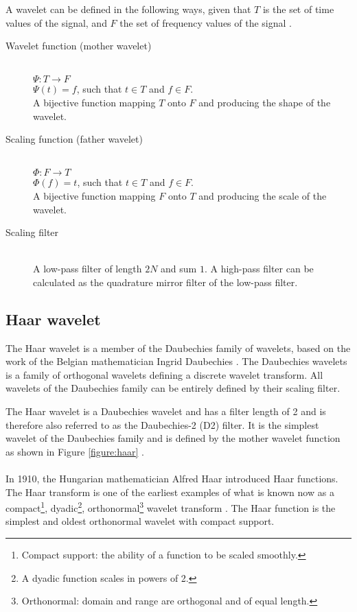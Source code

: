 A wavelet can be defined in the following ways, given that $T$ is the set of
time values of the signal, and $F$ the set of frequency values of the signal 
\cite{graps}.
\begin{description}
	\item[Wavelet function (mother wavelet)] \hfill \\ $\Psi: T \rightarrow
	F$\\ $\Psi(t) = f$, such that $t \in T$ and $f \in F$.\\
	A bijective function mapping $T$ onto $F$ and producing the shape of the
	wavelet.

	\item[Scaling function (father wavelet)] \hfill \\ $\Phi: F \rightarrow
	T$\\ $\Phi(f) = t$, such that $t \in T$ and $f \in F$.\\
	A bijective function mapping $F$ onto $T$ and producing the scale of the
	wavelet.

	\item[Scaling filter] \hfill \\ A low-pass filter of length $2N$ and sum $1$.
	A high-pass filter can be calculated as the quadrature mirror filter of the
	low-pass filter.
\end{description}

\subsection{Haar wavelet}
The Haar wavelet is a member of the Daubechies family of wavelets, based on the
work of the Belgian mathematician Ingrid Daubechies \cite{graps}. The
Daubechies wavelets is a family of orthogonal wavelets defining a discrete
wavelet transform. All wavelets of the Daubechies family can be entirely
defined by their scaling filter.

The Haar wavelet is a Daubechies wavelet and has a filter length of 2 and
is therefore also referred to as the Daubechies-2 (D2) filter. It is the
simplest wavelet of the Daubechies family and is defined by the mother wavelet
function as shown in Figure \ref{figure:haar} \cite{stankovic}.



\paragraph{}
In 1910, the Hungarian mathematician Alfred Haar introduced Haar functions. The
Haar transform is one of the earliest examples of what is known now as a
compact\footnote{Compact support: the ability of a function to be scaled
smoothly.}, dyadic\footnote{A dyadic function scales in powers of 2.},
orthonormal\footnote{Orthonormal: domain and range are orthogonal and of
equal length.} wavelet transform \cite{stankovic}. The Haar function is the
simplest and oldest orthonormal wavelet with compact support.


